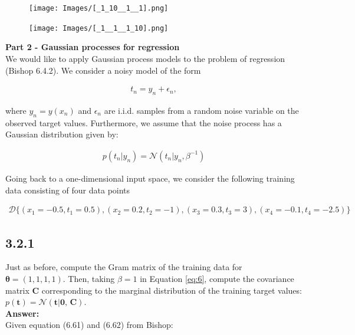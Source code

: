 \documentclass[a4paper]{article}
\begin{document}
\begin{figure}[H]
\texttt{[image: Images/[\_1\_10\_\_1\_\_1].png]}
\end{figure}

\begin{figure}[H]
\texttt{[image: Images/[\_1\_\_1\_\_1\_10].png]}
\end{figure}





\textbf{Part 2 - Gaussian processes for regression}\\

We would like to apply Gaussian process models to the problem of regression (Bishop 6.4.2). We consider a noisy model of the form 

\begin{align*}
t_n = y_n + \epsilon_n,
\end{align*}

where $y_n = y(x_n)$ and $\epsilon_n$ are i.i.d. samples from a random noise variable on the observed target values. Furthermore, we assume that the noise process has a Gaussian distribution given by:

\begin{eqnarray}
p(t_n | y_n) = \mathcal{N}(t_n | y_n, \beta^{-1})
 \label{eq:6}
\end{eqnarray}

Going back to a one-dimensional input space, we consider the following training data consisting of four data points 

\begin{align*}
\mathcal{D} \{ (x_1 = -0.5, t_1 = 0.5), (x_2 = 0.2, t_2 = -1), (x_3 = 0.3, t_3 = 3),(x_4 = -0.1, t_4 = -2.5) \}
\end{align*}


\subsection*{3.2.1}

Just as before, compute the Gram matrix of the training data for $\boldsymbol{\theta} = (1,1,1,1)$. Then, taking $\beta = 1$ in Equation \ref{eq:6}, compute the covariance matrix \textbf{C} corresponding to the marginal distribution of the training target values: $p(\textbf{t}) = \mathcal{N}(\textbf{t} | \textbf{0, C})$.\\

\textbf{Answer:}\\


Given equation (6.61) and (6.62) from Bishop:
\end{document}
